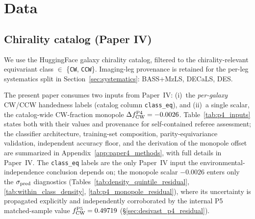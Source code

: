 \documentclass[aps,prd,twocolumn,superscriptaddress,showpacs,preprintnumbers,nofootinbib,longbibliography,floatfix]{revtex4-2}
\begin{document}
\section{Data}\label{sec:data}

\subsection{Chirality catalog (Paper IV)}

We use the HuggingFace galaxy chirality catalog,
filtered to the chirality-relevant equivariant class $\in$
\{\texttt{CW}, \texttt{CCW}\}. Imaging-leg provenance is retained for
the per-leg systematics split in Section~\ref{sec:systematics}:
BASS+MzLS, DECaLS, DES.

The present paper consumes two inputs from Paper~IV:
(i)~the \emph{per-galaxy} CW/CCW handedness labels (catalog column
\texttt{class\_eq}), and (ii)~a single scalar, the catalog-wide CW-fraction
monopole $\Delta f_{\rm CW}^{\rm P4} = -0.0026$. Table~\ref{tab:p4_inputs}
states both with their values and provenance for self-contained referee
assessment; the classifier architecture, training-set composition,
parity-equivariance validation, independent accuracy floor, and the
derivation of the monopole offset are summarized in
Appendix~\ref{app:paper4_methods}, with full details in Paper~IV. The
\texttt{class\_eq} labels are the only Paper~IV input the
environmental-independence conclusion depends on; the monopole scalar
$-0.0026$ enters only the $\sigma_{\rm pred}$ diagnostics
(Tables~\ref{tab:density_quintile_residual},
\ref{tab:within_class_density}, \ref{tab:p4_monopole_residual}), where
its uncertainty is propagated explicitly and independently corroborated by
the internal P5 matched-sample value $f_{\rm CW}^{\rm P5} = 0.49719$
(\S\ref{sec:desivast_p4_residual}).
\end{document}
